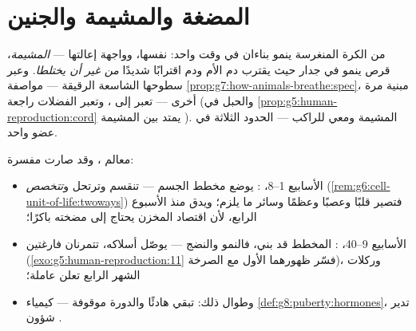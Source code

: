 \section{المضغة والمشيمة والجنين}

\begin{definition}[المشيمة]\label{def:g8:from-egg-to-birth:placenta}
من الكرة المنغرسة ينمو بناءان في وقت واحد: \emph{}
نفسها، وواجهة إعالتها --- \emph{المشيمة}،
قرص ينمو في جدار  حيث يقترب دم الأم ودم 
اقترابًا شديدًا \emph{من غير أن يختلطا}. وعبر سطوحها
الشاسعة الرقيقة --- مواصفة
\cref{prop:g7:how-animals-breathe:spec}، مبنية مرة أخرى
--- تعبر   إلى ، وتعبر الفضلات
 راجعة (والحبل في
\cref{prop:g5:human-reproduction:cord} يمتد بين المشيمة
). المشيمة  ومعي  للراكب --- الحدود
الثلاثة في عضو واحد.
\end{definition}

\begin{proposition}\label{prop:g8:from-egg-to-birth:timetable}
معالم ، وقد
صارت مفسرة:
\begin{itemize}
  \item الأسابيع 1--8، \emph{}: يوضع مخطط الجسم ---
        تنقسم  وترتحل و\emph{تتخصص}
        (\cref{rem:g6:cell-unit-of-life:twoways}) فتصير
        قلبًا وعصبًا وعظمًا وسائر ما يلزم؛ ويدق  منذ
        الأسبوع الرابع، لأن اقتصاد المخزن  يحتاج
        إلى مضخته باكرًا؛
  \item الأسابيع 9--40، \emph{}: المخطط قد بني،
        فالنمو والنضج ---  يوصّل أسلاكه، 
        تتمرنان فارغتين
        (\cref{exo:g5:human-reproduction:11} فسّر ظهورهما
        الأول مع الصرخة)، وركلات الشهر الرابع تعلن 
        عاملة؛
  \item وطوال ذلك: تبقي   هادئًا والدورة
        موقوفة --- كيمياء
        \cref{def:g8:puberty:hormones}، تدير شؤون .
\end{itemize}
\end{proposition}
\admitted

